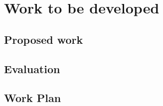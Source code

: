 
%

\chapter{Work to be developed}
\label{cha:work_to_be_developed}

\section{Proposed work}
\label{sub:sub_proposed_work}

\section{Evaluation}
\label{sub:evaluation}

\section{Work Plan}
\label{sub:work_plan}